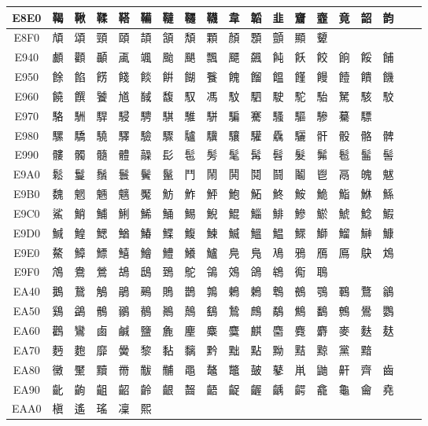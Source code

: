 \begin{table}[H]
\begin{tabular}{|Sc|*{16}{>{\centering\arraybackslash}p{1em}|}>{\centering\arraybackslash}p{2.5em}|}
E8E0 & 鞨 & 鞦 & 鞣 & 鞳 & 鞴 & 韃 & 韆 & 韈 & 韋 & 韜 & 韭 & 齏 & 韲 & 竟 & 韶 & 韵 \\ \hline
E8F0 & 頏 & 頌 & 頸 & 頤 & 頡 & 頷 & 頽 & 顆 & 顏 & 顋 & 顫 & 顯 & 顰 & & & \\ \hline
E940 & 顱 & 顴 & 顳 & 颪 & 颯 & 颱 & 颶 & 飄 & 飃 & 飆 & 飩 & 飫 & 餃 & 餉 & 餒 & 餔 \\ \hline
E950 & 餘 & 餡 & 餝 & 餞 & 餤 & 餠 & 餬 & 餮 & 餽 & 餾 & 饂 & 饉 & 饅 & 饐 & 饋 & 饑 \\ \hline
E960 & 饒 & 饌 & 饕 & 馗 & 馘 & 馥 & 馭 & 馮 & 馼 & 駟 & 駛 & 駝 & 駘 & 駑 & 駭 & 駮 \\ \hline
E970 & 駱 & 駲 & 駻 & 駸 & 騁 & 騏 & 騅 & 駢 & 騙 & 騫 & 騷 & 驅 & 驂 & 驀 & 驃 & \\ \hline
E980 & 騾 & 驕 & 驍 & 驛 & 驗 & 驟 & 驢 & 驥 & 驤 & 驩 & 驫 & 驪 & 骭 & 骰 & 骼 & 髀 \\ \hline
E990 & 髏 & 髑 & 髓 & 體 & 髞 & 髟 & 髢 & 髣 & 髦 & 髯 & 髫 & 髮 & 髴 & 髱 & 髷 & 髻 \\ \hline
E9A0 & 鬆 & 鬘 & 鬚 & 鬟 & 鬢 & 鬣 & 鬥 & 鬧 & 鬨 & 鬩 & 鬪 & 鬮 & 鬯 & 鬲 & 魄 & 魃 \\ \hline
E9B0 & 魏 & 魍 & 魎 & 魑 & 魘 & 魴 & 鮓 & 鮃 & 鮑 & 鮖 & 鮗 & 鮟 & 鮠 & 鮨 & 鮴 & 鯀 \\ \hline
E9C0 & 鯊 & 鮹 & 鯆 & 鯏 & 鯑 & 鯒 & 鯣 & 鯢 & 鯤 & 鯔 & 鯡 & 鰺 & 鯲 & 鯱 & 鯰 & 鰕 \\ \hline
E9D0 & 鰔 & 鰉 & 鰓 & 鰌 & 鰆 & 鰈 & 鰒 & 鰊 & 鰄 & 鰮 & 鰛 & 鰥 & 鰤 & 鰡 & 鰰 & 鱇 \\ \hline
E9E0 & 鰲 & 鱆 & 鰾 & 鱚 & 鱠 & 鱧 & 鱶 & 鱸 & 鳧 & 鳬 & 鳰 & 鴉 & 鴈 & 鳫 & 鴃 & 鴆 \\ \hline
E9F0 & 鴪 & 鴦 & 鶯 & 鴣 & 鴟 & 鵄 & 鴕 & 鴒 & 鵁 & 鴿 & 鴾 & 鵆 & 鵈 & & & \\ \hline
EA40 & 鵝 & 鵞 & 鵤 & 鵑 & 鵐 & 鵙 & 鵲 & 鶉 & 鶇 & 鶫 & 鵯 & 鵺 & 鶚 & 鶤 & 鶩 & 鶲 \\ \hline
EA50 & 鷄 & 鷁 & 鶻 & 鶸 & 鶺 & 鷆 & 鷏 & 鷂 & 鷙 & 鷓 & 鷸 & 鷦 & 鷭 & 鷯 & 鷽 & 鸚 \\ \hline
EA60 & 鸛 & 鸞 & 鹵 & 鹹 & 鹽 & 麁 & 麈 & 麋 & 麌 & 麒 & 麕 & 麑 & 麝 & 麥 & 麩 & 麸 \\ \hline
EA70 & 麪 & 麭 & 靡 & 黌 & 黎 & 黏 & 黐 & 黔 & 黜 & 點 & 黝 & 黠 & 黥 & 黨 & 黯 & \\ \hline
EA80 & 黴 & 黶 & 黷 & 黹 & 黻 & 黼 & 黽 & 鼇 & 鼈 & 皷 & 鼕 & 鼡 & 鼬 & 鼾 & 齊 & 齒 \\ \hline
EA90 & 齔 & 齣 & 齟 & 齠 & 齡 & 齦 & 齧 & 齬 & 齪 & 齷 & 齲 & 齶 & 龕 & 龜 & 龠 & 堯 \\ \hline
EAA0 & 槇 & 遙 & 瑤 & 凜 & 熙 & & & & & & & & & & & \\ \hline
\end{tabular}
\end{table}
